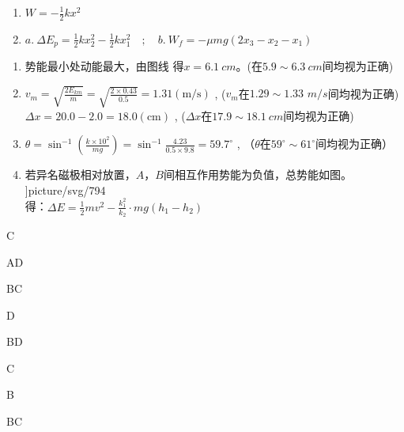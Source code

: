 \item \begin {enumerate} \renewcommand {\labelenumi }{\arabic {enumi}.} \item $W = - \frac { 1 } { 2 } k x ^ { 2 }$ \item $a. \ \Delta E _ { p } = \frac { 1 } { 2 } k x _ { 2 } ^ { 2 } - \frac { 1 } { 2 } k x _ { 1 } ^ { 2 } \quad ; \quad b . \ W _ { f } = - \mu m g \left ( 2 x _ { 3 } - x _ { 2 } - x _ { 1 } \right )$ \par \par \par \end {enumerate} \par \par 
\item \begin {enumerate} \renewcommand {\labelenumi }{\arabic {enumi}.} \item 势能最小处动能最大，由图线  得$ x=6.1\ cm $。(在$ 5.9 \sim 6.3 \ cm $间均视为正确) \item $v _ { m } = \sqrt { \frac { 2 E _ { k m } } { m } } = \sqrt { \frac { 2 \times 0.43 } { 0.5 } } = 1.31 ( \mathrm { m } / \mathrm { s } )$ , ($ v_{m} $在$ 1.29 \sim 1.33 $ $ m/s $间均视为正确) \\ $\Delta x = 20.0 - 2.0 = 18.0 ( \mathrm { cm } )$ , ($ \Delta x $在$ 17.9 \sim 18.1 \ cm $间均视为正确) \item $\theta = \sin ^ { - 1 } \left ( \frac { k \times 10 ^ { 2 } } { m g } \right ) = \sin ^ { - 1 } \frac { 4.23 } { 0.5 \times 9.8 } = 59.7 ^ { \circ }$ , （$ \theta $在$59 ^ { \circ } \sim 61 ^ { \circ }$间均视为正确） \item 若异名磁极相对放置，$ A $，$ B $间相互作用势能为负值，总势能如图。\\ \linewidth ]{picture/svg/794} \\ 得：$\Delta E = \frac { 1 } { 2 } m v ^ { 2 } - \frac { k _ { 1 } ^ { 2 } } { k _ { 2 } } \cdot m g \left ( h _ { 1 } - h _ { 2 } \right )$ \end {enumerate} \par \par 
\item C
\item AD
\item BC
\item D
\item BD
\item C
\item B
\item BC

